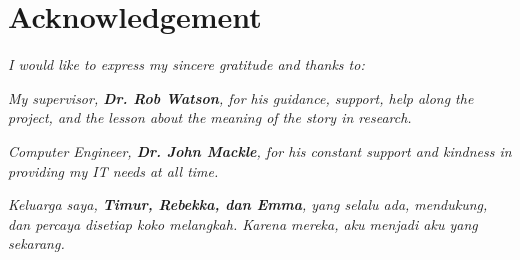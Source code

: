 \newpage
\centering
\section*{Acknowledgement} 

\vspace{6cm}
\textit{I would like to express my sincere gratitude and thanks to:}

\vspace{1cm}

\textit{My supervisor, \textbf{Dr. Rob Watson}, for his guidance, support, help along the project, and the lesson about the meaning of the story in research.}

\textit{Computer Engineer, \textbf{Dr. John Mackle}, for his constant support and kindness in providing my IT needs at all time.}

\textit{Keluarga saya, \textbf{Timur, Rebekka, dan Emma}, yang selalu ada, mendukung, dan percaya disetiap koko melangkah. Karena mereka, aku menjadi aku yang sekarang.}






